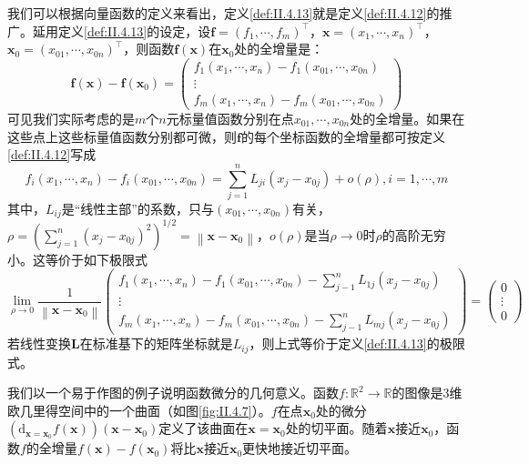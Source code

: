 \documentclass[../main.tex]{subfiles}
\begin{document}
我们可以根据向量函数的定义来看出，定义\ref{def:II.4.13}就是定义\ref{def:II.4.12}的推广。延用定义\ref{def:II.4.13}的设定，设$\mathbf{f}=\left(f_1,\cdots,f_m\right)^\intercal$，$\mathbf{x}=\left(x_1,\cdots,x_n\right)^\intercal$，$\mathbf{x}_0=\left(x_{01},\cdots,x_{0n}\right)^\intercal$，则函数$\mathbf{f}\left(\mathbf{x}\right)$在$\mathbf{x}_0$处的全增量是：
\[
    \mathbf{f}\left(\mathbf{x}\right)-\mathbf{f}\left(\mathbf{x}_0\right)=\left(
    \begin{array}{c}
            f_1\left(x_1,\cdots,x_n\right)-f_1\left(x_{01},\cdots,x_{0n}\right) \\
            \vdots                                                              \\
            f_m\left(x_1,\cdots,x_n\right)-f_m\left(x_{01},\cdots,x_{0n}\right)
        \end{array}\right)
\]
可见我们实际考虑的是$m$个$n$元标量值函数分别在点$x_{01},\cdots,x_{0n}$处的全增量。如果在这些点上这些标量值函数分别都可微，则$\mathbf{f}$的每个坐标函数的全增量都可按定义\ref{def:II.4.12}写成
\[
    f_i\left(x_1,\cdots,x_n\right)-f_i\left(x_{01},\cdots,x_{0n}\right)=\sum_{j=1}^n L_{ji}\left(x_j-x_{0j}\right)+o\left(\rho\right),i=1,\cdots,m
\]
其中，$L_{ij}$是“线性主部”的系数，只与$\left(x_{01},\cdots,x_{0n}\right)$有关，$\rho=\left(\sum_{j=1}^n\left(x_j-x_{0j}\right)^2\right)^{1/2}=\left\|\mathbf{x}-\mathbf{x}_0\right\|$，$o\left(\rho\right)$是当$\rho\to 0$时$\rho$的高阶无穷小。这等价于如下极限式
\[
    \lim_{\rho\to 0}\frac{1}{\left\|\mathbf{x}-\mathbf{x}_0\right\|}\left(\begin{array}{c}
            f_1\left(x_1,\cdots,x_n\right)-f_1\left(x_{01},\cdots,x_{0n}\right)-\sum_{j-1}^nL_{1j}\left(x_j-x_{0j}\right) \\
            \vdots                                                                                                        \\
            f_m\left(x_1,\cdots,x_n\right)-f_m\left(x_{01},\cdots,x_{0n}\right)-\sum_{j-1}^nL_{mj}\left(x_j-x_{0j}\right)
        \end{array}\right)=\left(\begin{array}{c}0\\\vdots\\0\end{array}\right)
\]
若线性变换$\mathbf{L}$在标准基下的矩阵坐标就是$L_{ij}$，则上式等价于定义\ref{def:II.4.13}的极限式。

我们以一个易于作图的例子说明函数微分的几何意义。函数$f:\mathbb{R}^2\rightarrow\mathbb{R}$的图像是3维欧几里得空间中的一个曲面（如图\ref{fig:II.4.7}）。$f$在点$\mathbf{x}_0$处的微分$\left(\mathrm{d}_{\mathbf{x}=\mathbf{x}_0}f\left(\mathbf{x}\right)\right)\left(\mathbf{x}-\mathbf{x}_0\right)$定义了该曲面在$\mathbf{x}=\mathbf{x}_0$处的切平面。随着$\mathbf{x}$接近$\mathbf{x}_0$，函数$f$的全增量$f\left(\mathbf{x}\right)-f\left(\mathbf{x}_0\right)$将比$\mathbf{x}$接近$\mathbf{x}_0$更快地接近切平面。
\end{document}
